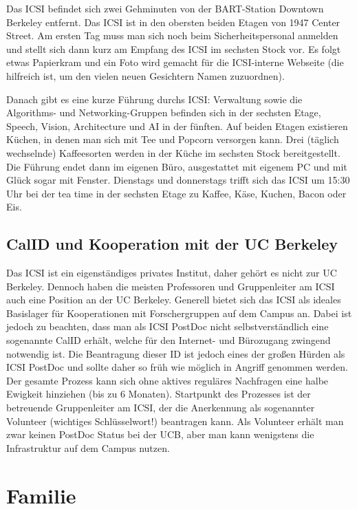 \documentclass[a4paper]{scrreprt}
\begin{document}
Das ICSI befindet sich zwei Gehminuten von der BART-Station Downtown Berkeley entfernt. Das ICSI ist in den obersten beiden Etagen von 1947 Center Street. Am ersten Tag muss man sich noch beim Sicherheitspersonal anmelden und stellt sich dann kurz am Empfang des ICSI im sechsten Stock vor. Es folgt etwas Papierkram und ein Foto wird gemacht für die ICSI-interne Webseite (die hilfreich ist, um den vielen neuen Gesichtern Namen zuzuordnen).

Danach gibt es eine kurze Führung durchs ICSI: Verwaltung sowie die Algorithms- und Networking-Gruppen befinden sich in der sechsten Etage, Speech, Vision, Architecture und AI in der fünften. Auf beiden Etagen existieren Küchen, in denen man sich mit Tee und Popcorn versorgen kann. Drei (täglich wechselnde) Kaffeesorten werden in der Küche im sechsten Stock bereitgestellt. Die Führung endet dann im eigenen Büro, ausgestattet mit eigenem PC und mit Glück sogar mit Fenster. Dienstags und donnerstags trifft sich das ICSI um 15:30 Uhr bei der tea time in der sechsten Etage zu Kaffee, Käse, Kuchen, Bacon oder Eis.

\section{CalID und Kooperation mit der UC Berkeley}

Das ICSI ist ein eigenständiges privates Institut, daher gehört es nicht zur UC Berkeley. 
Dennoch haben die meisten Professoren und Gruppenleiter am ICSI auch eine Position an der UC Berkeley. 
Generell bietet sich das ICSI als ideales Basislager für Kooperationen mit Forschergruppen auf dem Campus an. 
Dabei ist jedoch zu beachten, dass man als ICSI PostDoc nicht selbstverständlich eine sogenannte CalID erhält, 
welche für den Internet- und Bürozugang zwingend notwendig ist. Die Beantragung dieser ID ist jedoch eines der großen Hürden als ICSI PostDoc und sollte daher so früh wie möglich in Angriff genommen werden. Der gesamte Prozess kann sich ohne aktives reguläres Nachfragen eine halbe Ewigkeit hinziehen (bis zu 6 Monaten). Startpunkt des Prozesses ist der betreuende Gruppenleiter am ICSI, der die Anerkennung als sogenannter Volunteer (wichtiges Schlüsselwort!) beantragen kann. Als Volunteer erhält man zwar keinen PostDoc Status bei der UCB, aber man kann wenigstens die Infrastruktur auf dem Campus nutzen. 


\chapter{Familie}
\end{document}
